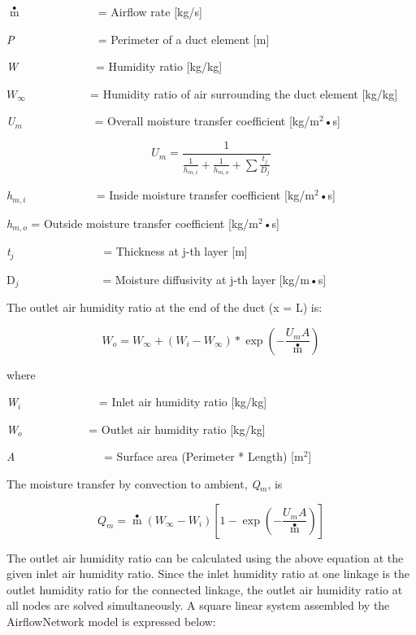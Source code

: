 \(\mathop m\limits^ \bullet\) ~~~~~~~~~~~~ = Airflow rate {[}kg/s{]}

\emph{P~~~}~~~~~~~~~~~ = Perimeter of a duct element {[}m{]}

\emph{W~~}~~~~~~~~~~~ = Humidity ratio {[}kg/kg{]}

\(W{}_\infty\) ~~~~~~~~~~ = Humidity ratio of air surrounding the duct element {[}kg/kg{]}

\emph{U\(_{m}\)}~~~~~~~~~~~~ = Overall moisture transfer coefficient {[}kg/m\(^{2}\)•s{]}

\begin{equation}
{U_m} = \frac{1}{{\frac{1}{{{h_{m,i}}}} + \frac{1}{{{h_{m,o}}}} + \sum {\frac{{{t_j}}}{{{D_j}}}} }}
\end{equation}

\emph{h\(_{m,i}\)} ~~~~~~~~~~~ = Inside moisture transfer coefficient {[}kg/m\(^{2}\)•s{]}

\emph{h\(_{m,o}\)} = Outside moisture transfer coefficient {[}kg/m\(^{2}\)•s{]}

\emph{t\(_{j}\)}~~~~~~~~~~~~~~~ = Thickness at j-th layer {[}m{]}

D\(_{j}\)~~~~~~~~~~~~~~ = Moisture diffusivity at j-th layer {[}kg/m•s{]}

The outlet air humidity ratio at the end of the duct (x = L) is:

\begin{equation}
{W_o} = {W_\infty } + ({W_i} - {W_\infty })*\exp \left( { - \frac{{{U_m}A}}{{\mathop m\limits^ \bullet  }}} \right)
\end{equation}

where

\emph{W\(_{i}\)}~~~~~~~~~~~~~ = Inlet air humidity ratio {[}kg/kg{]}

\emph{W\(_{o}\)}~~~~~~~~~~~ = Outlet air humidity ratio {[}kg/kg{]}

\emph{A}~~~~~~~~~~~~~~~ = Surface area (Perimeter * Length) {[}m\(^{2}\){]}

The moisture transfer by convection to ambient, \emph{Q\(_{m}\)}, is

\begin{equation}
{Q_m} = \mathop m\limits^ \bullet  ({W_\infty } - {W_i})\left[ {1 - \exp \left( { - \frac{{{U_m}A}}{{\mathop m\limits^ \bullet  }}} \right)} \right]
\end{equation}

The outlet air humidity ratio can be calculated using the above equation at the given inlet air humidity ratio. Since the inlet humidity ratio at one linkage is the outlet humidity ratio for the connected linkage, the outlet air humidity ratio at all nodes are solved simultaneously. A square linear system assembled by the AirflowNetwork model is expressed below:

